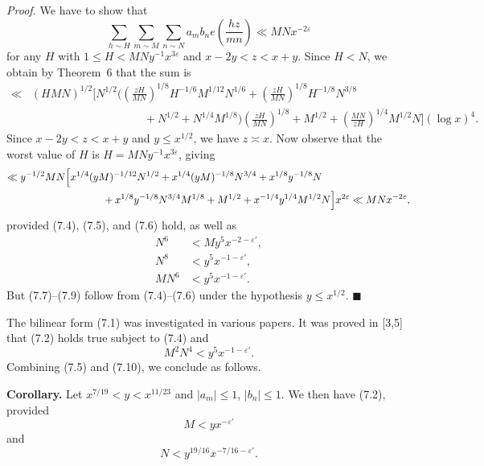 \documentclass[10pt]{article}
\begin{document}
\medskip
\noindent\textit{Proof.}
We have to show that
\[
 \sum_{h\sim H}\sum_{m\sim M}\sum_{n\sim N}
 a_mb_ne\left(\frac{hz}{mn}\right)\ll MNx^{-2\varepsilon}
\]
for any $H$ with $1\le H<MNy^{-1}x^{3\varepsilon}$ and
$x-2y<z<x+y$. Since $H<N$, we obtain by Theorem~6 that the sum is
\[
\begin{aligned}
\ll{}&(HMN)^{1/2}\Biggl[N^{1/2}
 \Biggl(\left(\frac{zH}{MN}\right)^{1/8}H^{-1/6}M^{1/12}N^{1/6}
 +\left(\frac{zH}{MN}\right)^{1/8}H^{-1/8}N^{3/8}\\
&\hspace{10em}{}+N^{1/2}+N^{1/4}M^{1/8}\Biggr)
 \left(\frac{zH}{MN}\right)^{1/8}
 +M^{1/2}+\left(\frac{MN}{zH}\right)^{1/4}M^{1/2}N\Biggr]
 (\log x)^4.
\end{aligned}
\]
Since $x-2y<z<x+y$ and $y\le x^{1/2}$, we have $z\asymp x$.
Now observe that the worst value of $H$ is
$H=MNy^{-1}x^{3\varepsilon}$, giving
\[
\begin{aligned}
\ll{}&y^{-1/2}MN\Bigl[x^{1/4}(yM)^{-1/12}N^{1/2}
 +x^{1/4}(yM)^{-1/8}N^{3/4}
 +x^{1/8}y^{-1/8}N\\
&\hspace{8em}{}+x^{1/8}y^{-1/8}N^{3/4}M^{1/8}
 +M^{1/2}+x^{-1/4}y^{1/4}M^{1/2}N\Bigr]x^{2\varepsilon}
 \ll MNx^{-2\varepsilon},
\end{aligned}
\]
provided (7.4), (7.5), and (7.6) hold, as well as
\begin{align*}
 N^6&<My^5x^{-2-\varepsilon'},                               \tag{7.7}\\
 N^8&<y^5x^{-1-\varepsilon'},                                \tag{7.8}\\
 MN^6&<y^5x^{-1-\varepsilon'}.                               \tag{7.9}
\end{align*}
But (7.7)--(7.9) follow from (7.4)--(7.6) under the hypothesis
$y\le x^{1/2}$. \(\blacksquare\)

The bilinear form (7.1) was investigated in various papers. It was proved
in [3,5] that (7.2) holds true subject to (7.4) and
\begin{equation*}
 M^2N^4<y^5x^{-1-\varepsilon'}.
\tag{7.10}
\end{equation*}
Combining (7.5) and (7.10), we conclude as follows.

\medskip
\noindent\textbf{Corollary.}
Let $x^{7/19}<y<x^{11/23}$ and $|a_m|\le1$, $|b_n|\le1$. We then have
(7.2), provided
\begin{equation*}
 M<yx^{-\varepsilon'}
\tag{7.4}
\end{equation*}
and
\begin{equation*}
 N<y^{19/16}x^{-7/16-\varepsilon'}.
\tag{7.11}
\end{equation*}
\end{document}
